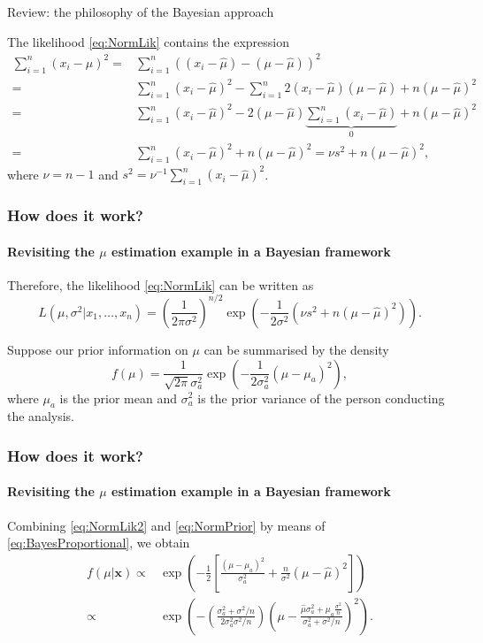 \documentclass[10pt]{beamer}
\theoremstyle{definition}
\begin{document}
\begin{section}{Review: the philosophy of the Bayesian approach}
\begin{frame}[fragile]
The likelihood \eqref{eq:NormLik} contains the expression
\begin{equation}
\label{eq:NormLik1}
\begin{split} \sum_{i=1}^{n}(x_i-\mu)^2= &
\sum_{i=1}^{n}\left((x_i-\hat{\mu})-(\mu-\hat{\mu})\right)^2\\
=&\sum_{i=1}^{n}(x_i-\hat{\mu})^2-\sum_{i=1}^{n}2(x_i-\hat{\mu})(\mu-\hat{\mu})+n(\mu-\hat{\mu})^2\\=&\sum_{i=1}^{n}(x_i-\hat{\mu})^2-2(\mu-\hat{\mu})\underbrace{\sum_{i=1}^{n}(x_i-\hat{\mu})}_{0}+n(\mu-\hat{\mu})^2\\
=&\sum_{i=1}^{n}(x_i-\hat{\mu})^2+n(\mu-\hat{\mu})^2 = \nu s^2+n(\mu-\hat{\mu})^2,
\end{split}
\end{equation}
where $\nu=n-1$ and $s^2=\nu^{-1}\sum_{i=1}^{n}(x_i-\hat{\mu})^2$.
\end{frame}

\begin{frame}[fragile]
\frametitle{How does it work?}
\framesubtitle{Revisiting the $ \mu $ estimation example in a Bayesian framework}
Therefore, the likelihood \eqref{eq:NormLik} can be written as
\begin{equation}
\label{eq:NormLik2}
L(\mu,\sigma^2|x_1,\ldots,x_n)=\left( \frac{1}{2\pi\sigma^2}
\right)^{n/2}\exp\left(-\frac{1}{2\sigma^2}\left(\nu
s^2+n(\mu-\hat{\mu})^2\right)\right).
\end{equation} \bigskip

Suppose our prior information on $\mu$ can be summarised by the density
\begin{equation}
\label{eq:NormPrior}
f(\mu)=\frac{1}{\sqrt{2\pi}\sigma^2_a}\exp\left(
-\frac{1}{2\sigma^2_a}(\mu-\mu_a)^2 \right),
\end{equation}
where $\mu_a$ is the prior mean and $\sigma_a^2$ is the prior variance of the person conducting the analysis.
\end{frame}

\begin{frame}[fragile]
\frametitle{How does it work?}
\framesubtitle{Revisiting the $ \mu $ estimation example in a Bayesian framework}
Combining \eqref{eq:NormLik2} and
\eqref{eq:NormPrior} by means of \eqref{eq:BayesProportional},
we obtain \begin{equation}
\label{NormPosterior} \begin{split}
f(\mu|\mathbf{x})\propto & \exp\left( -\frac{1}{2}\left[
\frac{(\mu-\mu_a)^2}{\sigma_a^2}+\frac{n}{\sigma^2}(\mu-\hat{\mu})^2
\right] \right) \\ \propto & \exp \left( -\left(
\frac{\sigma_a^2+\sigma^2/n}{2\sigma^2_a\sigma^2/n} \right)\left(
\mu-\frac{\hat{\mu}\sigma^2_a+\mu_a\frac{\sigma^2}{n}}{\sigma^2_a+\sigma^2/n}
\right)^2 \right). \end{split}
\end{equation}\bigskip


\end{frame}
\end{section}
\end{document}
